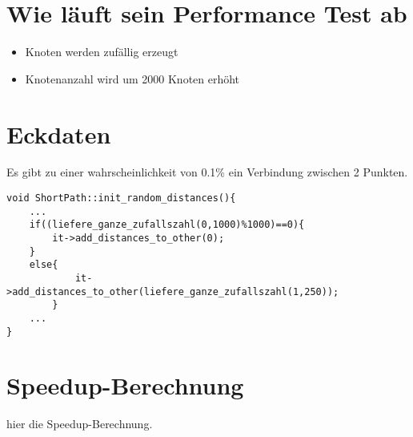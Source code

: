 \section{Wie läuft sein Performance Test ab}

\begin{itemize}
	\item Knoten werden zufällig erzeugt
	\item Knotenanzahl wird um 2000 Knoten erhöht
\end{itemize}

\section{Eckdaten}
Es gibt zu einer wahrscheinlichkeit von 0.1\% ein Verbindung zwischen 2 Punkten.
\begin{verbatim} 
void ShortPath::init_random_distances(){
    ...
	if((liefere_ganze_zufallszahl(0,1000)%1000)==0){
	    it->add_distances_to_other(0);    
	}
	else{
	        it->add_distances_to_other(liefere_ganze_zufallszahl(1,250));    
	    }
    ...
} 

\end{verbatim} 


\section{Speedup-Berechnung}
hier die Speedup-Berechnung.